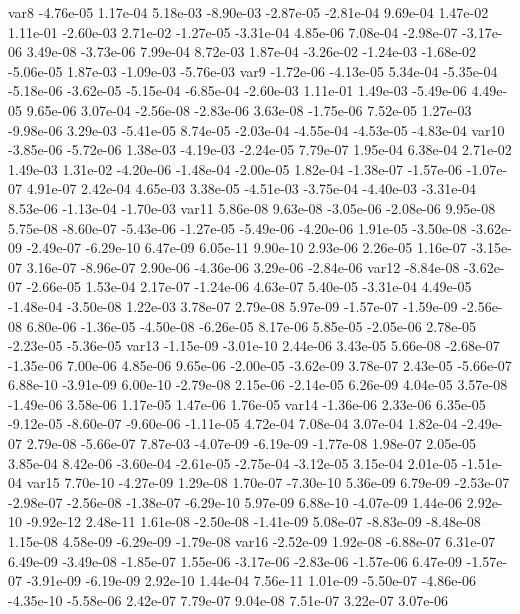 var8 -4.76e-05  1.17e-04  5.18e-03 -8.90e-03 -2.87e-05 -2.81e-04  9.69e-04  1.47e-02  1.11e-01 -2.60e-03  2.71e-02 -1.27e-05 -3.31e-04  4.85e-06  7.08e-04 -2.98e-07 -3.17e-06  3.49e-08 -3.73e-06  7.99e-04  8.72e-03  1.87e-04 -3.26e-02 -1.24e-03 -1.68e-02 -5.06e-05  1.87e-03 -1.09e-03 -5.76e-03
var9 -1.72e-06 -4.13e-05  5.34e-04 -5.35e-04 -5.18e-06 -3.62e-05 -5.15e-04 -6.85e-04 -2.60e-03  1.11e-01  1.49e-03 -5.49e-06  4.49e-05  9.65e-06  3.07e-04 -2.56e-08 -2.83e-06  3.63e-08 -1.75e-06  7.52e-05  1.27e-03 -9.98e-06  3.29e-03 -5.41e-05  8.74e-05 -2.03e-04 -4.55e-04 -4.53e-05 -4.83e-04
var10 -3.85e-06 -5.72e-06  1.38e-03 -4.19e-03 -2.24e-05  7.79e-07  1.95e-04  6.38e-04  2.71e-02  1.49e-03  1.31e-02 -4.20e-06 -1.48e-04 -2.00e-05  1.82e-04 -1.38e-07 -1.57e-06 -1.07e-07  4.91e-07  2.42e-04  4.65e-03  3.38e-05 -4.51e-03 -3.75e-04 -4.40e-03 -3.31e-04  8.53e-06 -1.13e-04 -1.70e-03
var11  5.86e-08  9.63e-08 -3.05e-06 -2.08e-06  9.95e-08  5.75e-08 -8.60e-07 -5.43e-06 -1.27e-05 -5.49e-06 -4.20e-06  1.91e-05 -3.50e-08 -3.62e-09 -2.49e-07 -6.29e-10  6.47e-09  6.05e-11  9.90e-10  2.93e-06  2.26e-05  1.16e-07 -3.15e-07  3.16e-07 -8.96e-07  2.90e-06 -4.36e-06  3.29e-06 -2.84e-06
var12 -8.84e-08 -3.62e-07 -2.66e-05  1.53e-04  2.17e-07 -1.24e-06  4.63e-07  5.40e-05 -3.31e-04  4.49e-05 -1.48e-04 -3.50e-08  1.22e-03  3.78e-07  2.79e-08  5.97e-09 -1.57e-07 -1.59e-09 -2.56e-08  6.80e-06 -1.36e-05 -4.50e-08 -6.26e-05  8.17e-06  5.85e-05 -2.05e-06  2.78e-05 -2.23e-05 -5.36e-05
var13 -1.15e-09 -3.01e-10  2.44e-06  3.43e-05  5.66e-08 -2.68e-07 -1.35e-06  7.00e-06  4.85e-06  9.65e-06 -2.00e-05 -3.62e-09  3.78e-07  2.43e-05 -5.66e-07  6.88e-10 -3.91e-09  6.00e-10 -2.79e-08  2.15e-06 -2.14e-05  6.26e-09  4.04e-05  3.57e-08 -1.49e-06  3.58e-06  1.17e-05  1.47e-06  1.76e-05
var14 -1.36e-06  2.33e-06  6.35e-05 -9.12e-05 -8.60e-07 -9.60e-06 -1.11e-05  4.72e-04  7.08e-04  3.07e-04  1.82e-04 -2.49e-07  2.79e-08 -5.66e-07  7.87e-03 -4.07e-09 -6.19e-09 -1.77e-08  1.98e-07  2.05e-05  3.85e-04  8.42e-06 -3.60e-04 -2.61e-05 -2.75e-04 -3.12e-05  3.15e-04  2.01e-05 -1.51e-04
var15  7.70e-10 -4.27e-09  1.29e-08  1.70e-07 -7.30e-10  5.36e-09  6.79e-09 -2.53e-07 -2.98e-07 -2.56e-08 -1.38e-07 -6.29e-10  5.97e-09  6.88e-10 -4.07e-09  1.44e-06  2.92e-10 -9.92e-12  2.48e-11  1.61e-08 -2.50e-08 -1.41e-09  5.08e-07 -8.83e-09 -8.48e-08  1.15e-08  4.58e-09 -6.29e-09 -1.79e-08
var16 -2.52e-09  1.92e-08 -6.88e-07  6.31e-07  6.49e-09 -3.49e-08 -1.85e-07  1.55e-06 -3.17e-06 -2.83e-06 -1.57e-06  6.47e-09 -1.57e-07 -3.91e-09 -6.19e-09  2.92e-10  1.44e-04  7.56e-11  1.01e-09 -5.50e-07 -4.86e-06 -4.35e-10 -5.58e-06  2.42e-07  7.79e-07  9.04e-08  7.51e-07  3.22e-07  3.07e-06
